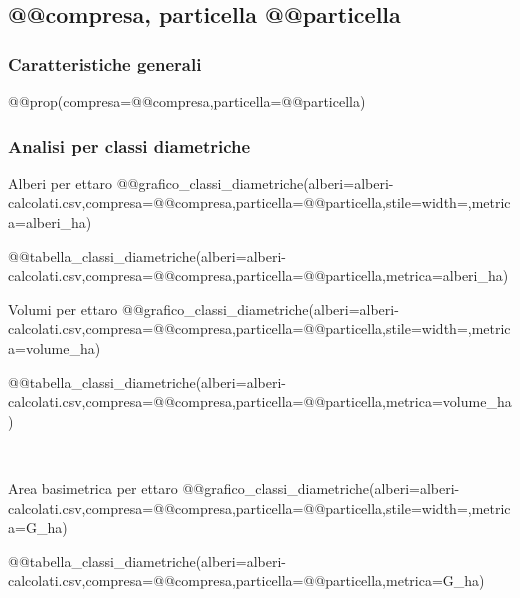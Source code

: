 \subsection*{@@compresa, particella @@particella}

{\footnotesize

\subsubsection*{Caratteristiche generali}
@@prop(compresa=@@compresa,particella=@@particella)

\subsubsection*{Analisi per classi diametriche}

\begin{minipage}[t][][c]{0.5\textwidth}
    \noindent \textsf{Alberi per ettaro}
    @@grafico_classi_diametriche(alberi=alberi-calcolati.csv,compresa=@@compresa,particella=@@particella,stile=width=\textwidth,metrica=alberi_ha)
    \begingroup
        \setlength{\LTleft}{0pt}
        \begin{flushright}
            @@tabella_classi_diametriche(alberi=alberi-calcolati.csv,compresa=@@compresa,particella=@@particella,metrica=alberi_ha)
        \end{flushright}
    \endgroup
\end{minipage}%
\hfill
\begin{minipage}[t][][c]{0.5\textwidth}
    \noindent \textsf{Volumi per ettaro}
    @@grafico_classi_diametriche(alberi=alberi-calcolati.csv,compresa=@@compresa,particella=@@particella,stile=width=\textwidth,metrica=volume_ha)
    \begingroup
        \setlength{\LTleft}{0pt}
        \begin{flushright}
            @@tabella_classi_diametriche(alberi=alberi-calcolati.csv,compresa=@@compresa,particella=@@particella,metrica=volume_ha)
        \end{flushright}
    \endgroup
\end{minipage}
\\
\begin{minipage}[t][][c]{0.5\textwidth}
    \noindent \textsf{Area basimetrica per ettaro}
    @@grafico_classi_diametriche(alberi=alberi-calcolati.csv,compresa=@@compresa,particella=@@particella,stile=width=\textwidth,metrica=G_ha)
    \begingroup
        \setlength{\LTleft}{0pt}
        \begin{flushright}
            @@tabella_classi_diametriche(alberi=alberi-calcolati.csv,compresa=@@compresa,particella=@@particella,metrica=G_ha)

\end{flushright}
\end{minipage}}
